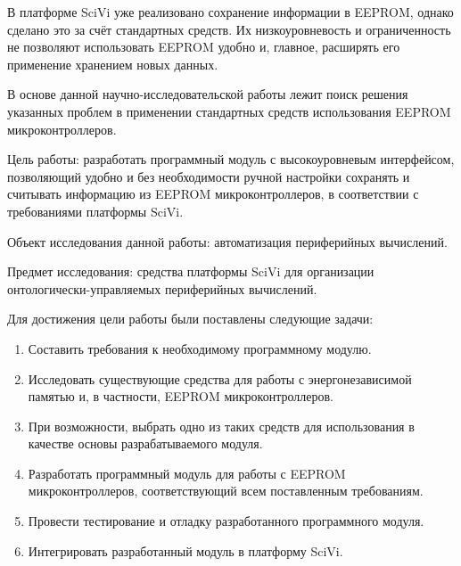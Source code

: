 В платформе SciVi уже реализовано сохранение информации в EEPROM, однако сделано это за счёт стандартных средств. 
Их низкоуровневость и ограниченность не позволяют использовать EEPROM удобно и, главное, расширять его применение хранением новых данных.

В основе данной научно-исследовательской работы лежит поиск решения указанных проблем в применении стандартных средств использования EEPROM микроконтроллеров.

Цель работы: разработать программный модуль с высокоуровневым интерфейсом, позволяющий удобно и без необходимости ручной настройки сохранять и считывать информацию из EEPROM микроконтроллеров, в соответствии с требованиями платформы SciVi.

Объект исследования данной работы: автоматизация периферийных вычислений.

Предмет исследования: средства платформы SciVi для организации онтологически-управляемых периферийных вычислений.

Для достижения цели работы были поставлены следующие задачи:
\begin{enumerate}
	\item Составить требования к необходимому программному модулю.
	\item Исследовать существующие средства для работы с энергонезависимой памятью и, в частности, EEPROM микроконтроллеров.
	\item При возможности, выбрать одно из таких средств для использования в качестве основы разрабатываемого модуля.
	\item Разработать программный модуль для работы с EEPROM микроконтроллеров, соответствующий всем поставленным требованиям.
	\item Провести тестирование и отладку разработанного программного модуля.
	\item Интегрировать разработанный модуль в платформу SciVi.
\end{enumerate}
